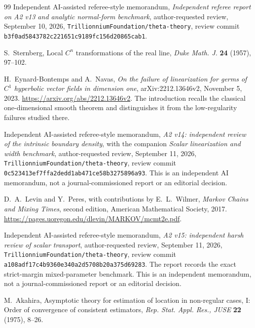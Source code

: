 \begin{thebibliography}{99}
Independent AI-assisted referee-style memorandum,
\emph{Independent referee report on A2 v13 and analytic normal-form
benchmark}, author-requested review, September 10, 2026,
\texttt{Trillionnium\allowbreak Foundation/\allowbreak theta-theory},
review commit \texttt{b3f0ad58\allowbreak 43782c22\allowbreak 1651c918\allowbreak 9fc156d2\allowbreak 0865cab1}.

S.~Sternberg, Local $C^n$ transformations of the real line,
\emph{Duke Math. J.} \textbf{24} (1957), 97--102.

H.~Eynard-Bontemps and A.~Navas, \emph{On the failure of linearization
for germs of $C^1$ hyperbolic vector fields in dimension one},
arXiv:2212.13646v2, November 5, 2023.
\url{https://arxiv.org/abs/2212.13646v2}.
The introduction recalls the classical one-dimensional smooth theorem
and distinguishes it from the low-regularity failures studied there.

Independent AI-assisted referee-style memorandum,
\emph{A2 v14: independent review of the intrinsic boundary density},
with the companion \emph{Scalar linearization and width benchmark},
author-requested review, September 11, 2026,
\texttt{Trillionnium\allowbreak Foundation/\allowbreak theta-theory},
review commit \texttt{0c523413\allowbreak ef7ffa2d\allowbreak edd1ab47\allowbreak 1ce58b32\allowbreak 75896a93}.
This is an independent AI memorandum, not a journal-commissioned report
or an editorial decision.

D.~A.~Levin and Y.~Peres, with contributions by E.~L.~Wilmer,
\emph{Markov Chains and Mixing Times}, second edition,
American Mathematical Society, 2017.
\url{https://pages.uoregon.edu/dlevin/MARKOV/mcmt2e.pdf}.

Independent AI-assisted referee-style memorandum,
\emph{A2 v15: independent harsh review of scalar transport},
author-requested review, September 11, 2026,
\texttt{Trillionnium\allowbreak Foundation/\allowbreak theta-theory},
review commit \texttt{a108adf1\allowbreak 7c4b9360\allowbreak e340a2d5\allowbreak 708b20a3\allowbreak 75d69283}.
The report records the exact strict-margin mixed-parameter benchmark.
This is an independent memorandum, not a journal-commissioned report
or an editorial decision.

M.~Akahira, Asymptotic theory for estimation of location in non-regular
cases, I: Order of convergence of consistent estimators,
\emph{Rep. Stat. Appl. Res., JUSE} \textbf{22} (1975), 8--26.


\end{thebibliography}
